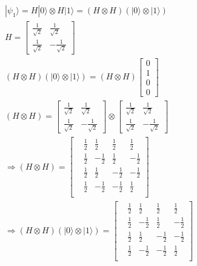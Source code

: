 \documentclass{article}
\begin{document}
\begin{equation}
\begin{split}
    & |\psi_1\rangle = H|0\rangle \otimes H|1\rangle = (H \otimes H)(|0\rangle \otimes |1\rangle) \\
    & H = \begin{bmatrix}
        \frac{1}{\sqrt{2}} & \frac{1}{\sqrt{2}} \\
        \frac{1}{\sqrt{2}} & -\frac{1}{\sqrt{2}}
    \end{bmatrix} \\
    & (H \otimes H)(|0\rangle \otimes |1\rangle) = (H \otimes H)\begin{bmatrix} 0 \\ 1 \\ 0 \\ 0 \end{bmatrix} \\
    & (H \otimes H) = \begin{bmatrix}
        \frac{1}{\sqrt{2}} & \frac{1}{\sqrt{2}} \\
        \frac{1}{\sqrt{2}} & -\frac{1}{\sqrt{2}}
    \end{bmatrix} \otimes \begin{bmatrix}
        \frac{1}{\sqrt{2}} & \frac{1}{\sqrt{2}} \\
        \frac{1}{\sqrt{2}} & -\frac{1}{\sqrt{2}}
    \end{bmatrix} \\
    & \Longrightarrow (H \otimes H) = \begin{bmatrix}
        & \frac{1}{2} & \frac{1}{2} & \frac{1}{2} & \frac{1}{2} \\
        & \frac{1}{2} & -\frac{1}{2} & \frac{1}{2} & -\frac{1}{2} \\
        & \frac{1}{2} & \frac{1}{2} & -\frac{1}{2} & -\frac{1}{2} \\
        & \frac{1}{2} & -\frac{1}{2} & -\frac{1}{2} & \frac{1}{2} \\
    \end{bmatrix} \\
    & \Longrightarrow (H \otimes H)(|0\rangle \otimes |1\rangle) = \begin{bmatrix}
        & \frac{1}{2} & \frac{1}{2} & \frac{1}{2} & \frac{1}{2} \\
        & \frac{1}{2} & -\frac{1}{2} & \frac{1}{2} & -\frac{1}{2} \\
        & \frac{1}{2} & \frac{1}{2} & -\frac{1}{2} & -\frac{1}{2} \\
        & \frac{1}{2} & -\frac{1}{2} & -\frac{1}{2} & \frac{1}{2} \\

\end{bmatrix}
\end{split}
\end{equation}
\end{document}
